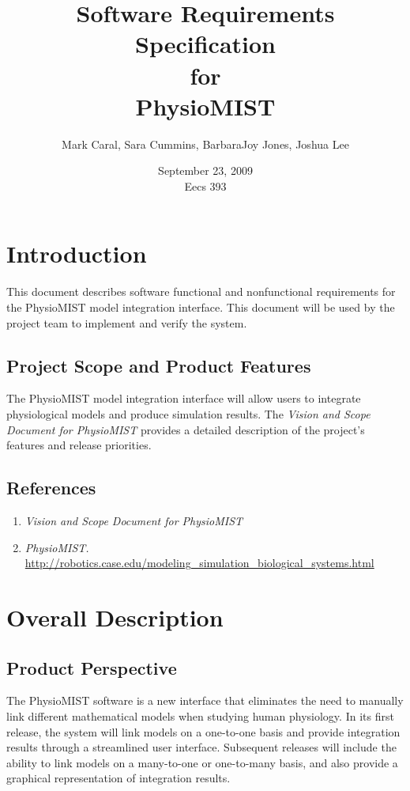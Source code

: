 \documentclass{article}
\title{Software Requirements Specification\\
\bigskip
{\large for}\\
\bigskip
PhysioMIST}
\author{Mark Caral, Sara Cummins, BarbaraJoy Jones, Joshua Lee}
\date{September 23, 2009\\{\sc Eecs} 393}
\begin{document}
\begin{titlepage}
\maketitle\thispagestyle{empty}
\end{titlepage}

\tableofcontents
\newpage

\section{Introduction}
This document describes software functional and nonfunctional requirements for the PhysioMIST model integration interface. This document will be used by the project team to implement and verify the system.

\subsection{Project Scope and Product Features}
The PhysioMIST model integration interface will allow users to integrate physiological models and produce simulation results. The \emph{Vision and Scope Document for PhysioMIST} provides a detailed description of the project's features and release priorities.

\subsection{References}
\begin{enumerate}
\item \emph{Vision and Scope Document for PhysioMIST}
\item \emph{PhysioMIST.} \url{http://robotics.case.edu/modeling_simulation_biological_systems.html}
\end{enumerate}

\section{Overall Description}
\subsection{Product Perspective}
The PhysioMIST software is a new interface that eliminates the need to manually link different mathematical models when studying human physiology. In its first release, the system will link models on a one-to-one basis and provide integration results through a streamlined user interface. Subsequent releases will include the ability to link models on a many-to-one or one-to-many basis, and also provide a graphical representation of integration results.
\end{document}
